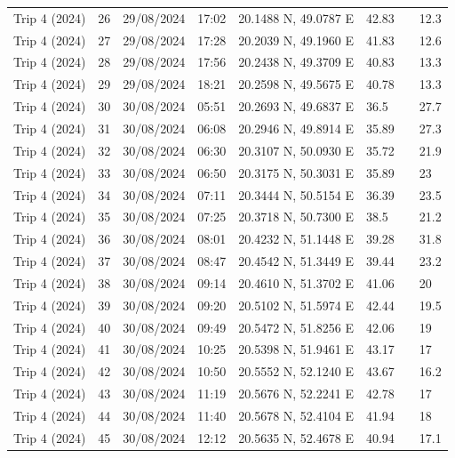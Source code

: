 \begin{scriptsize}
\begin{longtable}{llllllll}
Trip 4 (2024) & 26 & 29/08/2024 & 17:02 & 20.1488 N, 49.0787 E & 42.83 & \textemdash{} & 12.3 \\
Trip 4 (2024) & 27 & 29/08/2024 & 17:28 & 20.2039 N, 49.1960 E & 41.83 & \textemdash{} & 12.6 \\
Trip 4 (2024) & 28 & 29/08/2024 & 17:56 & 20.2438 N, 49.3709 E & 40.83 & \textemdash{} & 13.3 \\
Trip 4 (2024) & 29 & 29/08/2024 & 18:21 & 20.2598 N, 49.5675 E & 40.78 & \textemdash{} & 13.3 \\
Trip 4 (2024) & 30 & 30/08/2024 & 05:51 & 20.2693 N, 49.6837 E & 36.5 & \textemdash{} & 27.7 \\
Trip 4 (2024) & 31 & 30/08/2024 & 06:08 & 20.2946 N, 49.8914 E & 35.89 & \textemdash{} & 27.3 \\
Trip 4 (2024) & 32 & 30/08/2024 & 06:30 & 20.3107 N, 50.0930 E & 35.72 & \textemdash{} & 21.9 \\
Trip 4 (2024) & 33 & 30/08/2024 & 06:50 & 20.3175 N, 50.3031 E & 35.89 & \textemdash{} & 23 \\
Trip 4 (2024) & 34 & 30/08/2024 & 07:11 & 20.3444 N, 50.5154 E & 36.39 & \textemdash{} & 23.5 \\
Trip 4 (2024) & 35 & 30/08/2024 & 07:25 & 20.3718 N, 50.7300 E & 38.5 & \textemdash{} & 21.2 \\
Trip 4 (2024) & 36 & 30/08/2024 & 08:01 & 20.4232 N, 51.1448 E & 39.28 & \textemdash{} & 31.8 \\
Trip 4 (2024) & 37 & 30/08/2024 & 08:47 & 20.4542 N, 51.3449 E & 39.44 & \textemdash{} & 23.2 \\
Trip 4 (2024) & 38 & 30/08/2024 & 09:14 & 20.4610 N, 51.3702 E & 41.06 & \textemdash{} & 20 \\
Trip 4 (2024) & 39 & 30/08/2024 & 09:20 & 20.5102 N, 51.5974 E & 42.44 & \textemdash{} & 19.5 \\
Trip 4 (2024) & 40 & 30/08/2024 & 09:49 & 20.5472 N, 51.8256 E & 42.06 & \textemdash{} & 19 \\
Trip 4 (2024) & 41 & 30/08/2024 & 10:25 & 20.5398 N, 51.9461 E & 43.17 & \textemdash{} & 17 \\
Trip 4 (2024) & 42 & 30/08/2024 & 10:50 & 20.5552 N, 52.1240 E & 43.67 & \textemdash{} & 16.2 \\
Trip 4 (2024) & 43 & 30/08/2024 & 11:19 & 20.5676 N, 52.2241 E & 42.78 & \textemdash{} & 17 \\
Trip 4 (2024) & 44 & 30/08/2024 & 11:40 & 20.5678 N, 52.4104 E & 41.94 & \textemdash{} & 18 \\
Trip 4 (2024) & 45 & 30/08/2024 & 12:12 & 20.5635 N, 52.4678 E & 40.94 & \textemdash{} & 17.1 \\

\end{longtable}
\end{scriptsize}
